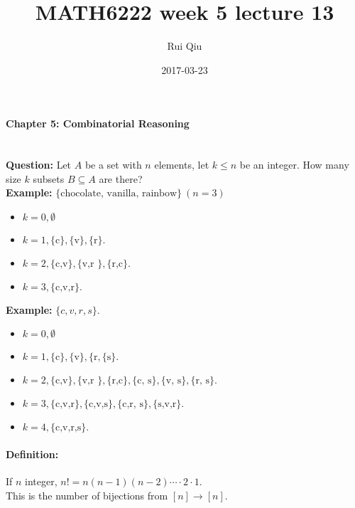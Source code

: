 \documentclass[a4paper, 11pt, twoside]{article}
\begin{document}
\title{MATH6222 week 5 lecture 13}
\author{Rui Qiu}
\date{2017-03-23}

\maketitle

\paragraph{Chapter 5: Combinatorial Reasoning}\ \\

\textbf{Question:} Let $A$ be a set with $n$ elements, let $k\leq n$ be an integer. How many size $k$ subsets $B\subseteq A$ are there?\\

\textbf{Example:} $\{\text{chocolate, vanilla, rainbow}\}\ (n=3)$

\begin{itemize}
	\item $k=0, \emptyset$
	\item $k=1, \{\text{c}\}, \{\text{v}\}, \{\text{r}\}.$
	\item $k=2, \{\text{c,v}\}, \{\text{v,r }\}, \{\text{r,c}\}.$
	\item $k=3, \{\text{c,v,r}\}.$\\
\end{itemize}

\textbf{Example:} $\{c,v,r,s\}.$

\begin{itemize}
	\item $k=0, \emptyset$
	\item $k=1, \{\text{c}\}, \{\text{v}\}, \{\text{r}, \{\text{s}\}.$
	\item $k=2, \{\text{c,v}\}, \{\text{v,r }\}, \{\text{r,c}\}, \{\text{c, s}\}, \{\text{v, s}\}, \{\text{r, s}\}.$
	\item $k=3, \{\text{c,v,r}\}, \{\text{c,v,s}\}, \{\text{c,r, s}\}, \{\text{s,v,r}\}.$
	\item $k=4, \{\text{c,v,r,s}\}.$\\
\end{itemize}

\paragraph{Definition:} If $n$ integer, $n!=n(n-1)(n-2)\cdots \cdot 2 \cdot 1.$\\

This is the number of bijections from $[n]\to [n]$.\\
\end{document}
